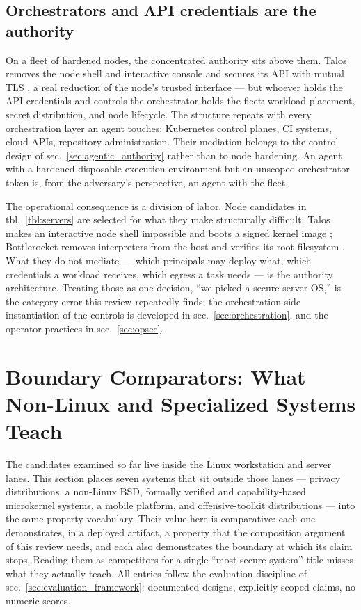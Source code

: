 \documentclass[
  english,
  9pt,
]{extarticle}
\begin{document}
\subsection{Orchestrators and API credentials are the
authority}\label{orchestrators-and-api-credentials-are-the-authority}

On a fleet of hardened nodes, the concentrated authority sits above
them. Talos removes the node shell and interactive console and secures
its API with mutual TLS \citep{talos_repo}, a real reduction of the
node's trusted interface --- but whoever holds the API credentials and
controls the orchestrator holds the fleet: workload placement, secret
distribution, and node lifecycle. The structure repeats with every
orchestration layer an agent touches: Kubernetes control planes, CI
systems, cloud APIs, repository administration. Their mediation belongs
to the control design of sec.~\ref{sec:agentic_authority} rather than to
node hardening. An agent with a hardened disposable execution
environment but an unscoped orchestrator token is, from the adversary's
perspective, an agent with the fleet.

The operational consequence is a division of labor. Node candidates in
tbl.~\ref{tbl:servers} are selected for what they make structurally
difficult: Talos makes an interactive node shell impossible and boots a
signed kernel image \citep{talos_secureboot}; Bottlerocket removes
interpreters from the host and verifies its root filesystem
\citep{bottlerocket_security_features}. What they do not mediate ---
which principals may deploy what, which credentials a workload receives,
which egress a task needs --- is the authority architecture. Treating
those as one decision, ``we picked a secure server OS,'' is the category
error this review repeatedly finds; the orchestration-side instantiation
of the controls is developed in sec.~\ref{sec:orchestration}, and the
operator practices in sec.~\ref{sec:opsec}.

\newpage

\section{Boundary Comparators: What Non-Linux and Specialized Systems
Teach}\label{sec:comparators}

The candidates examined so far live inside the Linux workstation and
server lanes. This section places seven systems that sit outside those
lanes --- privacy distributions, a non-Linux BSD, formally verified and
capability-based microkernel systems, a mobile platform, and
offensive-toolkit distributions --- into the same property vocabulary.
Their value here is comparative: each one demonstrates, in a deployed
artifact, a property that the composition argument of this review needs,
and each also demonstrates the boundary at which its claim stops.
Reading them as competitors for a single ``most secure system'' title
misses what they actually teach. All entries follow the evaluation
discipline of sec.~\ref{sec:evaluation_framework}: documented designs,
explicitly scoped claims, no numeric scores.
\end{document}
